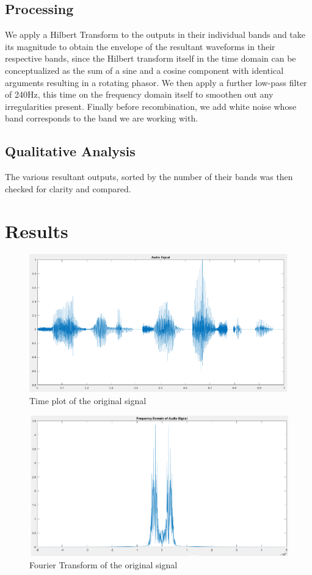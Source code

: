\documentclass{article}
\begin{document}
\subsection{Processing}
We apply a Hilbert Transform to the outputs in their individual bands and
take its magnitude to obtain the envelope of the resultant waveforms in their
respective bands, since the Hilbert transform itself in the time domain can be
conceptualized as the sum of a sine and a cosine component with identical
arguments resulting in a rotating phasor. We then apply a further low-pass
filter of 240Hz, this time on the frequency domain itself to smoothen out any
irregularities present. Finally before recombination, we add white noise whose
band corresponds to the band we are working with.

\subsection{Qualitative Analysis}
The various resultant outputs, sorted by the number of their bands was then
checked for clarity and compared.

\section{Results}
\begin{figure}[!ht]
\includegraphics[width=\textwidth]{Signal.png}
\caption{Time plot of the original signal}
\label{fig:sig}
\end{figure}

\begin{figure}[!ht]
\includegraphics[width=\textwidth]{FFT.png}
\caption{Fourier Transform of the original signal}
\label{fig:FFT}
\end{figure}
\end{document}
